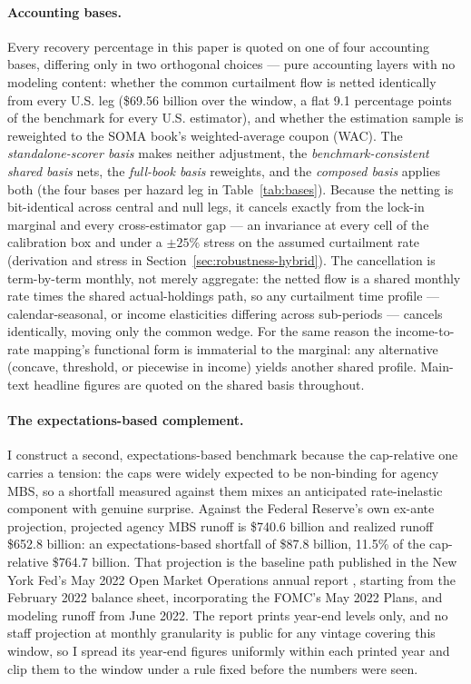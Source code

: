 \paragraph{Accounting bases.} Every recovery percentage in this paper is quoted on one of four accounting bases, differing only in two orthogonal choices --- pure accounting layers with no modeling content: whether the common curtailment flow is netted identically from every U.S. leg (\$69.56 billion over the window, a flat 9.1 percentage points of the benchmark for every U.S. estimator), and whether the estimation sample is reweighted to the SOMA book's weighted-average coupon (WAC). The \emph{standalone-scorer basis} makes neither adjustment, the \emph{benchmark-consistent shared basis} nets, the \emph{full-book basis} reweights, and the \emph{composed basis} applies both (the four bases per hazard leg in Table~\ref{tab:bases}). Because the netting is bit-identical across central and null legs, it cancels exactly from the lock-in marginal and every cross-estimator gap --- an invariance at every cell of the calibration box and under a $\pm 25\%$ stress on the assumed curtailment rate (derivation and stress in Section~\ref{sec:robustness-hybrid}). The cancellation is term-by-term monthly, not merely aggregate: the netted flow is a shared monthly rate times the shared actual-holdings path, so any curtailment time profile --- calendar-seasonal, or income elasticities differing across sub-periods --- cancels identically, moving only the common wedge. For the same reason the income-to-rate mapping's functional form is immaterial to the marginal: any alternative (concave, threshold, or piecewise in income) yields another shared profile. Main-text headline figures are quoted on the shared basis throughout.

\paragraph{The expectations-based complement.} I construct a second, expectations-based benchmark because the cap-relative one carries a tension: the caps were widely expected to be non-binding for agency MBS, so a shortfall measured against them mixes an anticipated rate-inelastic component with genuine surprise. Against the Federal Reserve's own ex-ante projection, projected agency MBS runoff is \$740.6 billion and realized runoff \$652.8 billion: an expectations-based shortfall of \$87.8 billion, 11.5\% of the cap-relative \$764.7 billion. That projection is the baseline path published in the New York Fed's May 2022 Open Market Operations annual report \citep{omo2021}, starting from the February 2022 balance sheet, incorporating the FOMC's May 2022 Plans, and modeling runoff from June 2022. The report prints year-end levels only, and no staff projection at monthly granularity is public for any vintage covering this window, so I spread its year-end figures uniformly within each printed year and clip them to the window under a rule fixed before the numbers were seen.

